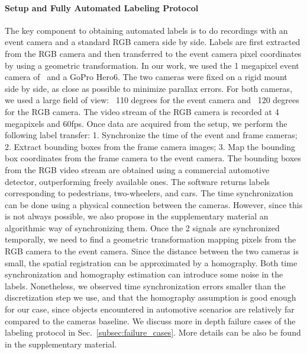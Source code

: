 \documentclass{article}
\begin{document}
\paragraph{Setup and Fully Automated Labeling Protocol}
The key component to obtaining automated labels is to do recordings with an event camera and a standard RGB camera
side by side. Labels are first extracted from the RGB camera and then transferred to the event camera pixel coordinates by using a geometric transformation.
In our work, we used the 1 megapixel event camera of~\cite{finateu20205} and a GoPro Hero6.
The two cameras were fixed on a rigid mount side by side, 
as close as possible to minimize parallax errors.
For both cameras, we used a large field of view:
~110 degrees for the event camera and ~120 degrees for the RGB camera. The video stream of the RGB camera is recorded at 4 megapixels and 60fps.
Once data are acquired from the setup, we perform the following label transfer:
1. Synchronize the time of the event and frame cameras; 2. Extract bounding boxes from the frame camera images; 3. Map the bounding box coordinates from the frame camera to the event camera.
The bounding boxes from the RGB video stream are obtained using a commercial automotive detector, outperforming freely available ones.
The software returns labels corresponding to pedestrians, two-wheelers, and cars. 
The time synchronization can be done using a physical connection between the cameras.
However, since this is not always possible, we also propose in the supplementary material an algorithmic way of synchronizing them.
Once the 2 signals are synchronized temporally, we need to find a geometric transformation mapping pixels from the RGB camera to the event camera.
Since the distance between the two cameras is small,
the spatial registration can be approximated by a homography. Both time synchronization and homography estimation can introduce some noise in the labels. 
Nonetheless, we observed time synchronization errors smaller than the discretization step  we use, and that
the homography assumption is good enough for our case, since objects encountered in automotive scenarios are relatively far compared to the cameras baseline.
We discuss more in depth failure cases of the labeling protocol in Sec.~\ref{subsec:failure_cases}.
More details can be also be found in the supplementary material.


\vspace{-3mm}
\end{document}
